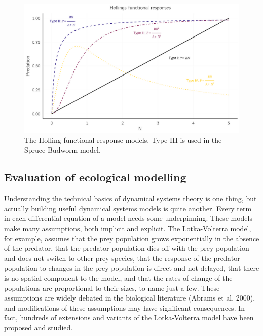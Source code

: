 \documentclass[
  a4paper,
  DIV=11,
  numbers=noendperiod,
  oneside]{scrreprt}
\begin{document}
\begin{figure}

{\centering \includegraphics{media/ch4n/fig-ch4n-img5-old-53.jpg}

}

\caption{\label{fig-ch4n-img5-old-53}The Holling functional response
models. Type III is used in the Spruce Budworm model.}

\end{figure}

\hypertarget{sec-Evaluation-of-ecological-modelling}{%
\subsection{Evaluation of ecological
modelling}\label{sec-Evaluation-of-ecological-modelling}}

Understanding the technical basics of dynamical systems theory is one
thing, but actually building useful dynamical systems models is quite
another. Every term in each differential equation of a model needs some
underpinning. These models make many assumptions, both implicit and
explicit. The Lotka-Volterra model, for example, assumes that the prey
population grows exponentially in the absence of the predator, that the
predator population dies off with the prey population and does not
switch to other prey species, that the response of the predator
population to changes in the prey population is direct and not delayed,
that there is no spatial component to the model, and that the rates of
change of the populations are proportional to their sizes, to name just
a few. These assumptions are widely debated in the biological literature
(Abrams et al. 2000), and modifications of these assumptions may have
significant consequences. In fact, hundreds of extensions and variants
of the Lotka-Volterra model have been proposed and studied.
\end{document}
